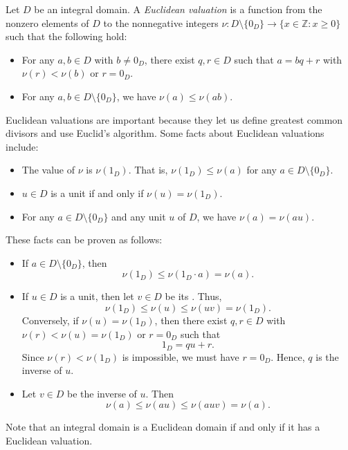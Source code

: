 \documentclass[12pt]{article}
\begin{document}

Let $D$ be an integral domain.  A \emph{Euclidean valuation} is a function from the nonzero elements of $D$ to the nonnegative integers $\nu \colon D \setminus \{0_D\} \to \{ x \in \mathbb{Z} : x \ge 0 \}$ such that the following hold:

\begin{itemize}
\item For any $a,b\in D$ with $b\neq 0_D$, there exist $q,r\in D$ such that $a=bq+r$ with $\nu(r)<\nu(b)$ or $r=0_D$.
\item For any $a,b\in D \setminus \{0_D\}$, we have $\nu(a)\leq\nu(ab)$.
\end{itemize}

Euclidean valuations are important because they let us define greatest common divisors and use Euclid's algorithm. Some facts about Euclidean valuations include:

\begin{itemize}
\item The  value of $\nu$ is $\nu(1_D)$. That is, $\nu(1_D)\leq\nu(a)$ for any $a\in D \setminus \{0_D\}$.
\item $u\in D$ is a unit if and only if $\nu(u)=\nu(1_D)$.
\item For any $a\in D \setminus \{0_D\}$ and any unit $u$ of $D$, we have $\nu(a)=\nu(au)$.
\end{itemize}

These facts can be proven as follows:

\begin{itemize}
\item If $a\in D \setminus \{0_D\}$, then
\[
\nu(1_D)\leq\nu(1_D\cdot a)=\nu(a).
\]
\item If $u\in D$ is a unit, then let $v\in D$ be its .  Thus,
\[
\nu(1_D)\leq\nu(u)\leq\nu(uv)=\nu(1_D).
\]
Conversely, if $\nu(u)=\nu(1_D)$, then there exist $q,r\in D$ with $\nu(r)<\nu(u)=\nu(1_D)$ or $r=0_D$ such that
\[
1_D=qu+r.
\]
Since $\nu(r)<\nu(1_D)$ is impossible, we must have $r=0_D$.  Hence, $q$ is the inverse of $u$.
\item Let $v\in D$ be the inverse of $u$.  Then
\[
\nu(a)\leq\nu(au)\leq\nu(auv)=\nu(a).
\]
\end{itemize}

Note that an integral domain is a Euclidean domain if and only if it has a Euclidean valuation.
\end{document}
